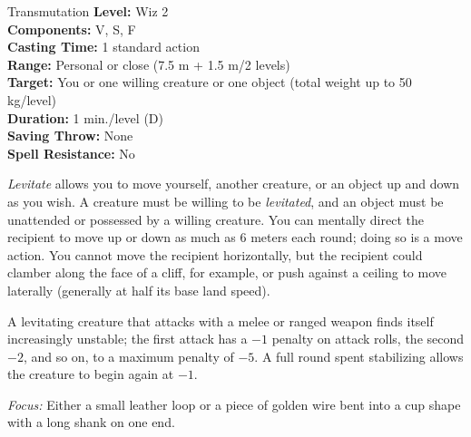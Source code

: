{Transmutation}
{
	\textbf{Level:}
	Wiz 2\\
	\textbf{Components:}
	V, S, F\\
	\textbf{Casting Time:}
	1 standard action\\
	\textbf{Range:}
	Personal or close (7.5 m + 1.5 m/2 levels)\\
	\textbf{Target:}
	You or one willing creature or one object (total weight up to 50 kg/level)\\
	\textbf{Duration:}
	1 min./level (D)\\
	\textbf{Saving Throw:}
	None\\
	\textbf{Spell Resistance:}
	No\\
}
{
	\emph{Levitate} allows you to move yourself, another creature, or an object up and down as you wish. A creature must be willing to be \emph{levitated}, and an object must be unattended or possessed by a willing creature. You can mentally direct the recipient to move up or down as much as 6 meters each round; doing so is a move action. You cannot move the recipient horizontally, but the recipient could clamber along the face of a cliff, for example, or push against a ceiling to move laterally (generally at half its base land speed).

	A levitating creature that attacks with a melee or ranged weapon finds itself increasingly unstable; the first attack has a $-1$ penalty on attack rolls, the second $-2$, and so on, to a maximum penalty of $-5$. A full round spent stabilizing allows the creature to begin again at $-1$.

	\textit{Focus:}
	Either a small leather loop or a piece of golden wire bent into a cup shape with a long shank on one end.

}
